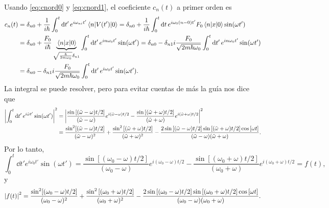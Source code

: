 \documentclass[10pt, a4paper]{article}
\numberwithin{equation}{subsection}
\begin{document}
Usando \eqref{eq:cnord0} y \eqref{eq:cnord1}, el coeficiente $c_n(t)$ a primer
orden es
\begin{align}
  c_n(t)
  &= \delta_{n0} + \frac{1}{i\hbar} \int_{0}^{t}\dd{t'} e^{i\omega_{ni}t'}
    \matrixel{n}{V(t')}{0}
  = \delta_{n0} + \frac{1}{i\hbar} \int_{0}^{t}\dd{t} e^{i\omega_0(n - 0)t'}
    F_0\matrixel{n}{x}{0}\sin(\omega t') \nonumber \\
  &= \delta_{n0} + \frac{F_0}{i\hbar}
    \underbrace{\matrixel{n}{x}{0}}_{\sqrt{\frac{\hbar}{2m\omega_0}}\delta_{n1}}
    \int_{0}^{t}\dd{t'} e^{in\omega_0t'} \sin(\omega t')
  = \delta_{n0} - \delta_{n1}i\frac{F_0}{\sqrt{2m\hbar\omega_0}}
    \int_{0}^{t}\dd{t'} e^{in\omega_0t'} \sin(\omega t') \nonumber \\
  &= \delta_{n0} - \delta_{n1}i\frac{F_0}{\sqrt{2m\hbar\omega_0}}
    \int_{0}^{t}\dd{t'} e^{i\omega_0t'} \sin(\omega t').
\end{align}
La integral se puede resolver, pero para evitar cuentas de más la guía nos dice
que
\begin{align}
  \abs{\int_0^t \dd{t'} e^{i\tilde{\omega}t'} \sin(\omega t')}^2 &=
    \abs{\frac{\sin\left[(\tilde{\omega} - \omega)t/2\right]}
    {(\tilde{\omega} - \omega)} e^{i(\tilde{\omega} - \omega)t/2} -
    \frac{\sin\left[(\tilde{\omega}+\omega)t/2\right]} {(\tilde{\omega} +
    \omega)} e^{i(\tilde{\omega} + \omega)t/2}}^2
    \label{eq:helptintsine} \\
  &= \frac{\sin^2[(\tilde{\omega} - \omega)t/2]}
    {(\tilde{\omega} - \omega)^2} + \frac{\sin^2\left[(\tilde{\omega} +
    \omega)t/2\right]} {(\tilde{\omega} + \omega)^2} -
    \frac{2\sin\left[(\tilde{\omega} - \omega)t/2\right]
    \sin\left[(\tilde{\omega} + \omega)t/2\right] \cos\left[\omega
    t\right]} {(\tilde{\omega} - \omega)(\tilde{\omega} + \omega)}.
\end{align}
Por lo tanto,
\begin{equation}
  \int_0^t \dd{t'} e^{i\omega_0t'} \sin(\omega t')
  = \frac{\sin\left[(\omega_0 - \omega)t/2\right]}
    {(\omega_0 - \omega)} e^{i(\omega_0 - \omega)t/2} -
    \frac{\sin\left[(\omega_0+\omega)t/2\right]} {(\omega_0 +
    \omega)} e^{i(\omega_0 + \omega)t/2}
  = f(t),
\end{equation}
y
\begin{equation}
  \abs{f(t)}^2
  = \frac{\sin^2[(\omega_0 - \omega)t/2]}
    {(\omega_0 - \omega)^2} + \frac{\sin^2\left[(\omega_0 +
    \omega)t/2\right]} {(\omega_0 + \omega)^2} -
    \frac{2\sin\left[(\omega_0 - \omega)t/2\right]
    \sin\left[(\omega_0 + \omega)t/2\right] \cos\left[\omega
    t\right]} {(\omega_0 - \omega)(\omega_0 + \omega)}.
\end{equation}
\end{document}

